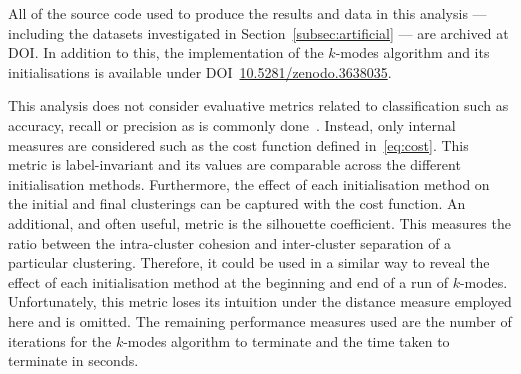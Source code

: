 \documentclass[smallextended]{svjour3}
\begin{document}
\begin{table}[htbp]
    \caption{A summary of the benchmark datasets.}\label{tab:dataset_summary}
\end{table}

All of the source code used to produce the results and data in this analysis ---
including the datasets investigated in Section~\ref{subsec:artificial} --- are
archived at DOI. In addition to this, the implementation of the \(k\)-modes
algorithm and its initialisations is available under
DOI~\href{https://doi.org/10.5281/zenodo.3638035}{10.5281/zenodo.3638035}.

This analysis does not consider evaluative metrics related to classification
such as accuracy, recall or precision as is commonly done~\cite{%
    Arthur2007,Cao2009,Cao2012,Huang1998,%
    Ng2007,Olaode2014,Schaeffer2007,Sharma2015%
}. Instead, only internal measures are considered such as the cost function
defined in~\eqref{eq:cost}. This metric is label-invariant and its values are
comparable across the different initialisation methods. Furthermore, the effect
of each initialisation method on the initial and final clusterings can be
captured with the cost function. An additional, and often useful, metric is the
silhouette coefficient. This measures the ratio between the intra-cluster
cohesion and inter-cluster separation of a particular clustering. Therefore, it
could be used in a similar way to reveal the effect of each initialisation
method at the beginning and end of a run of \(k\)-modes. Unfortunately, this
metric loses its intuition under the distance measure employed here and is
omitted. The remaining performance measures used are the number of iterations
for the \(k\)-modes algorithm to terminate and the time taken to terminate in
seconds.
\end{document}
